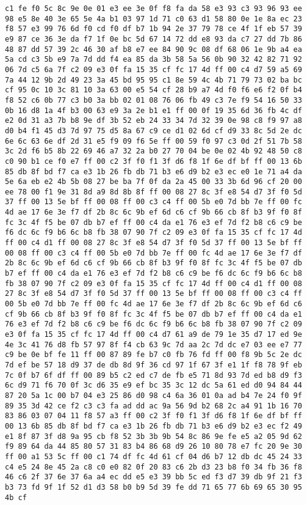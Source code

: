 \documentclass{article}
\begin{document}
\begin{verbatim}
c1 fe f0 5c 8c 9e 0e 01 e3 ee 3e 0f f8 fa da 58 e3 93 c3 93 96 93 ee 98 e5 8e 40 3e 65 5e 4a b1 03 97 1d 71 c0 63 d1 58 80 0e 1e 8a ec 23 f8 57 e3 99 76 6d f0 cd f0 df b7 1b 94 2e 37 79 78 ce 4f 1f eb 57 39 e9 87 ce 36 3e da f7 1f 0e bc 5d 67 14 72 dd e8 93 da c7 27 dd 7b 86 48 87 dd 57 39 2c 46 30 af b8 e7 ee 84 90 9c 08 df 68 06 1e 9b a4 ea 5a cd c3 5b e9 7a 7d dd f4 ea 85 da 3b 58 5a 56 0b 90 32 42 82 71 92 06 7d c5 6a 7f c2 09 e3 0f fa 15 35 cf fc 17 4d ff 00 c4 d7 59 a5 69 7a 44 12 9b 2d 49 23 3a 45 bd 95 95 c1 8e 59 4c 4b 71 79 73 02 ba bc cf 95 0c 10 3c 81 10 3a 63 00 e5 54 cf 28 b9 a7 4d f0 f6 e6 f2 0f b4 f8 52 c6 0b 77 c3 b0 3a bb 02 01 08 76 06 fb 49 c3 7e f9 54 16 50 33 0b 16 d8 1a 4f b3 00 63 e9 3a 2e b1 e1 ff 00 0f 19 35 6d 36 fb 4c df e2 0d 31 a3 7b b8 9e df 3b 52 eb 24 33 34 7d 32 39 0e 98 c8 f9 97 a8 d0 b4 f1 45 d3 7d 97 75 d5 8a 67 c9 ce d1 02 6d cf d9 33 8c 5d 2e dc 6e 6c 63 6e df 2d 31 e5 f9 09 f6 5e ff 00 59 f0 97 c3 0d 2f 51 7b 58 3c 2d f6 b5 8b 22 69 46 a7 32 2a b0 27 70 04 be 0e 02 4b 92 48 50 c8 c0 90 b1 ce f0 e7 ff 00 c2 3f f0 f1 3f d6 f8 1f 6e df bf ff 00 13 6b 85 db 8f bd f7 ca e3 1b 26 fb db 71 b3 e6 d9 b2 e3 ec e0 1e 71 a4 da 5e 6a eb e2 4b 5b 08 27 be ba 7f 0f da 2a 45 00 33 3b 6d 96 cf 20 00 ee 78 00 f1 9e 31 8d a9 8d 8b 8f ff 00 08 27 8c 3f e8 54 d7 3f f0 5d 37 ff 00 13 5e bf ff 00 08 ff 00 c3 c4 ff 00 5b e0 7d bb 7e ff 00 fc 4d ae 17 6e 3e f7 df 2b 8c 6c 9b ef 6d c6 cf 9b 66 cb 8f b3 9f f0 8f fc 3c 4f f5 be 07 db b7 ef ff 00 c4 da e1 76 e3 ef 7d f2 b8 c6 c9 be f6 dc 6c f9 b6 6c b8 fb 38 07 90 7f c2 09 e3 0f fa 15 35 cf fc 17 4d ff 00 c4 d1 ff 00 08 27 8c 3f e8 54 d7 3f f0 5d 37 ff 00 13 5e bf ff 00 08 ff 00 c3 c4 ff 00 5b e0 7d bb 7e ff 00 fc 4d ae 17 6e 3e f7 df 2b 8c 6c 9b ef 6d c6 cf 9b 66 cb 8f b3 9f f0 8f fc 3c 4f f5 be 07 db b7 ef ff 00 c4 da e1 76 e3 ef 7d f2 b8 c6 c9 be f6 dc 6c f9 b6 6c b8 fb 38 07 90 7f c2 09 e3 0f fa 15 35 cf fc 17 4d ff 00 c4 d1 ff 00 08 27 8c 3f e8 54 d7 3f f0 5d 37 ff 00 13 5e bf ff 00 08 ff 00 c3 c4 ff 00 5b e0 7d bb 7e ff 00 fc 4d ae 17 6e 3e f7 df 2b 8c 6c 9b ef 6d c6 cf 9b 66 cb 8f b3 9f f0 8f fc 3c 4f f5 be 07 db b7 ef ff 00 c4 da e1 76 e3 ef 7d f2 b8 c6 c9 be f6 dc 6c f9 b6 6c b8 fb 38 07 90 7f c2 09 e3 0f fa 15 35 cf fc 17 4d ff 00 c4 d7 61 a9 de 79 1e 35 d7 17 ed 9e 4e 3c 41 76 d8 fb 57 97 8f f4 cb 63 9c 7d aa 2c 7d dc e7 03 ee e7 77 c9 be 0e bf fe 11 ff 00 87 89 fe b7 c0 fb 76 fd ff 00 f8 9b 5c 2e dc 7d ef be 57 18 d9 37 de db 8d 9f 36 cd 97 1f 67 3f e1 1f f8 78 9f eb 7c 0f b7 6f df ff 00 89 b5 c2 ed c7 de fb e5 71 8d 93 7d ed b8 d9 f3 6c d9 71 f6 70 0f 3c d6 35 e9 ef bc 35 3c 12 dc 5a 61 ed d0 94 84 44 87 20 5a 1c 00 b7 04 e3 25 86 d0 98 c4 6a 36 01 0a ad b4 7e 24 f0 9f 89 35 3d 42 ce f2 c3 c3 fa ad dd ac 9a 56 9d b2 68 2c a4 91 1b 16 70 83 86 03 07 04 11 f8 57 a3 ff 00 c2 3f f0 f1 3f d6 f8 1f 6e df bf ff 00 13 6b 85 db 8f bd f7 ca e3 1b 26 fb db 71 b3 e6 d9 b2 e3 ec f2 49 e1 8f 87 3f d8 9a 95 cb f8 52 3b 3b 9b 54 8c 86 9e fe e5 a2 05 9d 62 f9 89 64 da 44 85 80 57 31 83 b4 86 68 d9 26 10 80 78 e7 fc 20 9e 30 ff 00 a1 53 5c ff 00 c1 74 df fc 4d 61 cf 04 d6 b7 12 db dc 45 24 33 c4 e5 24 8e 45 2a c8 c0 e0 82 0f 20 83 c6 2b d3 23 b8 f0 34 fb 36 f8 46 c6 2f 37 6e 37 6a a4 ec dd e5 e3 39 bb 5c ed f3 d7 39 db 9f 21 f3 b3 73 fd 9f 1f 52 d1 d3 58 b0 b9 5d 39 fe dd 71 65 77 6b 69 65 30 95 4b cf 
\end{verbatim}
\end{document}
